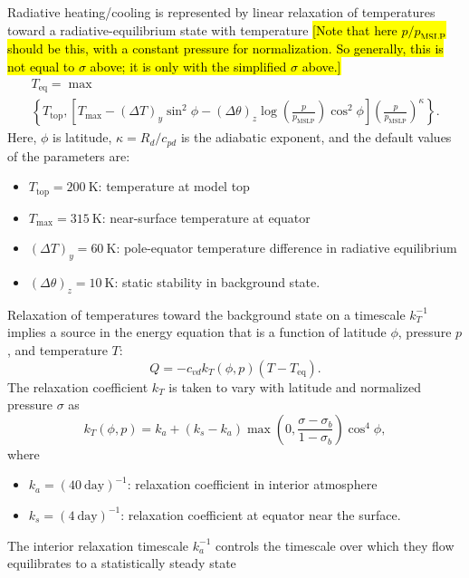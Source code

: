 \documentclass{report}
\begin{document}
Radiative heating/cooling is represented by linear relaxation of temperatures toward a radiative-equilibrium state with temperature \hl{[Note that here $p/p_{\mathrm{MSLP}}$ should be this, with a constant pressure for normalization. So generally, this is not equal to $\sigma$ above; it is only with the simplified $\sigma$ above.]}
\begin{multline}
    T_{\mathrm{eq}} = \max \\
    \left\{ T_{\mathrm{top}}, \left[ T_{\max} - (\Delta T)_y \sin^2 \phi - (\Delta \theta)_z \log\left(\frac{p}{p_{\mathrm{MSLP}}}\right) \cos^2 \phi \right]
    \left( \frac{p}{p_{\mathrm{MSLP}}} \right)^{\kappa} \right\}.
\end{multline}
Here, $\phi$ is latitude, $\kappa = R_d/c_{pd}$ is the adiabatic exponent, and the default values of the parameters are:
\begin{itemize}
    \item $T_{\mathrm{top}} = 200~\mathrm{K}$: temperature at model top
    \item $T_{\max} = 315~\mathrm{K}$: near-surface temperature at equator
    \item $(\Delta T)_y = 60~\mathrm{K}$: pole-equator temperature difference in radiative equilibrium
    \item $(\Delta \theta)_z = 10~\mathrm{K}$: static stability in background state.
\end{itemize}

Relaxation of temperatures toward the background state on a timescale $k_T^{-1}$ implies a source in the energy equation that is a function of latitude $\phi$, pressure $p$, and temperature $T$:
\begin{equation}
    Q =  - c_{vd} k_T(\phi, p) (T - T_{\mathrm{eq}}).
\end{equation} 
The relaxation coefficient $k_T$ is taken to vary with latitude and normalized pressure $\sigma$ as
\begin{equation}
k_T(\phi, p) = k_a + (k_s - k_a) \max\left(0, \frac{\sigma - \sigma_b}{1-\sigma_b}\right) \cos^4 \phi ,
\end{equation}
where 
\begin{itemize}
    \item $k_a = (40~\mathrm{day})^{-1}$: relaxation coefficient in interior atmosphere
    \item $k_s = (4~\mathrm{day})^{-1}$: relaxation coefficient  at equator near the surface.
\end{itemize}
The interior relaxation timescale $k_a^{-1}$ controls the timescale over which they flow equilibrates to a statistically steady state
\end{document}
